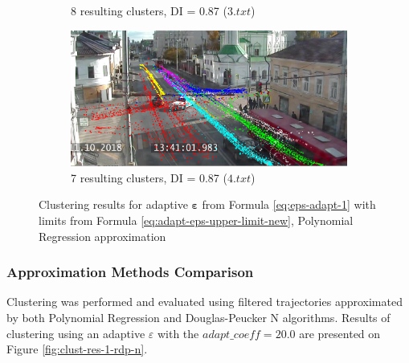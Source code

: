 \begin{figure}[!htb]
\begin{subfigure}[!htb]{0.23\textwidth}
		\caption{8 resulting clusters, DI = 0.87 ($3.txt$)}
		\label{fig:clust-res-1-regr-sqrt-3}
	\end{subfigure}
	\hfill
	\begin{subfigure}[!htb]{0.23\textwidth}
		\centering{}
		\includegraphics[width=\textwidth]{images/cl-res/clust-res-1-regr-sqrt-4.png}
		\caption{7 resulting clusters, DI = 0.87 ($4.txt$)}
		\label{fig:clust-res-1-regr-sqrt-4}
	\end{subfigure}
	\caption{Clustering results for adaptive $\bm{\varepsilon}$ from Formula \ref{eq:eps-adapt-1} with limits from Formula \ref{eq:adapt-eps-upper-limit-new}, Polynomial Regression approximation}
	\label{fig:clust-res-1-regr-sqrt}
\end{figure}

\subsubsection{Approximation Methods Comparison}

Clustering was performed and evaluated using filtered trajectories approximated by both Polynomial Regression and Douglas-Peucker N algorithms. Results of clustering using an adaptive $\varepsilon$ with the $adapt\_coeff = 20.0$ are presented on Figure \ref{fig:clust-res-1-rdp-n}.


